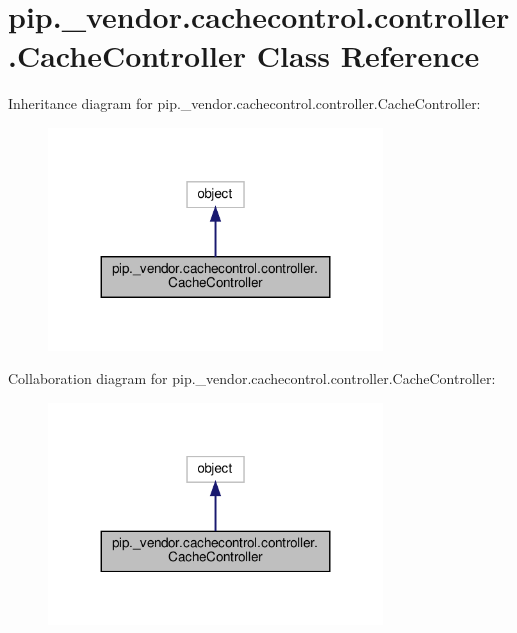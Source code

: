 \hypertarget{classpip_1_1__vendor_1_1cachecontrol_1_1controller_1_1CacheController}{}\section{pip.\+\_\+vendor.\+cachecontrol.\+controller.\+Cache\+Controller Class Reference}
\label{classpip_1_1__vendor_1_1cachecontrol_1_1controller_1_1CacheController}


Inheritance diagram for pip.\+\_\+vendor.\+cachecontrol.\+controller.\+Cache\+Controller\+:
\nopagebreak
\begin{figure}[H]
\begin{center}
\leavevmode
\includegraphics[width=251pt]{classpip_1_1__vendor_1_1cachecontrol_1_1controller_1_1CacheController__inherit__graph}
\end{center}
\end{figure}


Collaboration diagram for pip.\+\_\+vendor.\+cachecontrol.\+controller.\+Cache\+Controller\+:
\nopagebreak
\begin{figure}[H]
\begin{center}
\leavevmode
\includegraphics[width=251pt]{classpip_1_1__vendor_1_1cachecontrol_1_1controller_1_1CacheController__coll__graph}
\end{center}
\end{figure}
